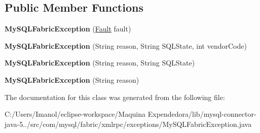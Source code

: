 \subsection*{Public Member Functions}
\begin{DoxyCompactItemize}
\item 
\mbox{\label{classcom_1_1mysql_1_1fabric_1_1xmlrpc_1_1exceptions_1_1_my_s_q_l_fabric_exception_a229e413f7449e5d6a0ac9f23cd137538}} 
{\bfseries My\+S\+Q\+L\+Fabric\+Exception} (\mbox{\hyperlink{classcom_1_1mysql_1_1fabric_1_1xmlrpc_1_1base_1_1_fault}{Fault}} fault)
\item 
\mbox{\label{classcom_1_1mysql_1_1fabric_1_1xmlrpc_1_1exceptions_1_1_my_s_q_l_fabric_exception_addb4762fb4ca2e6ee54527bf4d922c9f}} 
{\bfseries My\+S\+Q\+L\+Fabric\+Exception} (String reason, String S\+Q\+L\+State, int vendor\+Code)
\item 
\mbox{\label{classcom_1_1mysql_1_1fabric_1_1xmlrpc_1_1exceptions_1_1_my_s_q_l_fabric_exception_ab285904fc6370fbed9ee5a5d62228eb5}} 
{\bfseries My\+S\+Q\+L\+Fabric\+Exception} (String reason, String S\+Q\+L\+State)
\item 
\mbox{\label{classcom_1_1mysql_1_1fabric_1_1xmlrpc_1_1exceptions_1_1_my_s_q_l_fabric_exception_abf995e6baafd45e83ab13a94aa414f4c}} 
{\bfseries My\+S\+Q\+L\+Fabric\+Exception} (String reason)
\end{DoxyCompactItemize}


The documentation for this class was generated from the following file\+:\begin{DoxyCompactItemize}
\item 
C\+:/\+Users/\+Imanol/eclipse-\/workspace/\+Maquina Expendedora/lib/mysql-\/connector-\/java-\/5../src/com/mysql/fabric/xmlrpc/exceptions/My\+S\+Q\+L\+Fabric\+Exception.\+java\end{DoxyCompactItemize}
